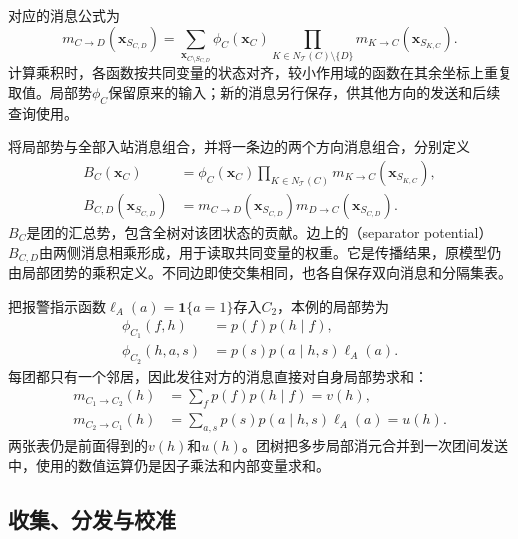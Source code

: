 对应的消息公式为
\begin{equation}
  m_{C\to D}(\bm{x}_{S_{C,D}})
    =\sum_{\bm{x}_{C\setminus S_{C,D}}}
      \phi_C(\bm{x}_C)
      \prod_{K\in N_{\mathcal{T}}(C)\setminus\{D\}}
        m_{K\to C}(\bm{x}_{S_{K,C}}).
  \label{eq:pgm-junction-tree-clique-message}
\end{equation}
计算乘积时，各函数按共同变量的状态对齐，较小作用域的函数在其余坐标上重复取值。局部势$\phi_C$保留原来的输入；新的消息另行保存，供其他方向的发送和后续查询使用。

将局部势与全部入站消息组合，并将一条边的两个方向消息组合，分别定义
\begin{equation}
  \begin{aligned}
    B_C(\bm{x}_C)
      &=\phi_C(\bm{x}_C)
        \prod_{K\in N_{\mathcal{T}}(C)}
          m_{K\to C}(\bm{x}_{S_{K,C}}),\\
    B_{C,D}(\bm{x}_{S_{C,D}})
      &=m_{C\to D}(\bm{x}_{S_{C,D}})
        m_{D\to C}(\bm{x}_{S_{C,D}}).
  \end{aligned}
  \label{eq:pgm-junction-tree-clique-separator-beliefs}
\end{equation}
$B_C$是团的汇总势，包含全树对该团状态的贡献。边上的（separator potential）$B_{C,D}$由两侧消息相乘形成，用于读取共同变量的权重。它是传播结果，原模型仍由局部团势的乘积定义。不同边即使交集相同，也各自保存双向消息和分隔集表。

把报警指示函数$\ell_A(a)=\mathbf{1}\{a=1\}$存入$C_2$，本例的局部势为
\[
  \begin{aligned}
    \phi_{C_1}(f,h)&=p(f)p(h\mid f),\\
    \phi_{C_2}(h,a,s)&=p(s)p(a\mid h,s)\ell_A(a).
  \end{aligned}
\]
每团都只有一个邻居，因此发往对方的消息直接对自身局部势求和：
\begin{equation}
  \begin{aligned}
    m_{C_1\to C_2}(h)&=\sum_f p(f)p(h\mid f)=v(h),\\
    m_{C_2\to C_1}(h)&=\sum_{a,s}p(s)p(a\mid h,s)\ell_A(a)=u(h).
  \end{aligned}
  \label{eq:pgm-junction-tree-device-clique-messages}
\end{equation}
两张表仍是前面得到的$v(h)$和$u(h)$。团树把多步局部消元合并到一次团间发送中，使用的数值运算仍是因子乘法和内部变量求和。

\subsection{收集、分发与校准}
\label{sec:pgm-junction-tree-calibration}

